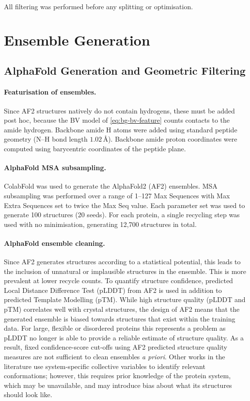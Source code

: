 All filtering was performed before any splitting or optimisation.

\section{Ensemble Generation}
\label{app:valdx-ensemble-generation}

\subsection{AlphaFold Generation and Geometric Filtering}
\label{app:valdx-af2}

\paragraph{Featurisation of ensembles.}
Since AF2 structures natively do not contain hydrogens, these must be added post hoc, because the BV model of \cref{eq:bg-bv-feature} counts contacts to the amide hydrogen. Backbone amide H atoms were added using standard peptide geometry (N--H bond length $1.02\,\text{\AA}$).\supercite{yaoNMRDeterminationAmide2008} Backbone amide proton coordinates were computed using barycentric coordinates of the peptide plane.

\paragraph{AlphaFold MSA subsampling.}
ColabFold was used to generate the AlphaFold2 (AF2) ensembles.\supercite{mirditaColabFoldMakingProtein2022} MSA subsampling\supercite{monteirodasilvaHighthroughputPredictionProtein2024} was performed over a range of 1--127 Max Sequences with Max Extra Sequences set to twice the Max Seq value. Each parameter set was used to generate 100 structures (20 seeds). For each protein, a single recycling step was used with no minimisation, generating 12,700 structures in total.

\paragraph{AlphaFold ensemble cleaning.}
Since AF2 generates structures according to a statistical potential, this leads to the inclusion of unnatural or implausible structures in the ensemble. This is more prevalent at lower recycle counts. To quantify structure confidence, predicted Local Distance Difference Test (pLDDT) from AF2 is used in addition to predicted Template Modelling (pTM). While high structure quality (pLDDT and pTM) correlates well with crystal structures, the design of AF2 means that the generated ensemble is biased towards structures that exist within the training data. For large, flexible or disordered proteins this represents a problem as pLDDT no longer is able to provide a reliable estimate of structure quality. As a result, fixed confidence-score cut-offs using AF2 predicted structure quality measures are not sufficient to clean ensembles \textit{a priori}. Other works in the literature use system-specific collective variables to identify relevant conformations; however, this requires prior knowledge of the protein system, which may be unavailable, and may introduce bias about what its structures should look like.

